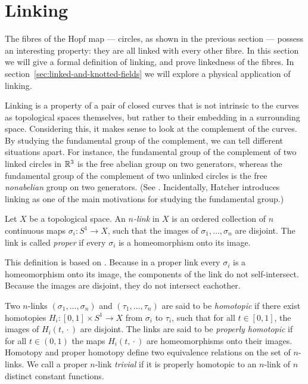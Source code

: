 \section{Linking}
\label{sec:linking}
The fibres of the Hopf map — circles, as shown in the previous section — possess an interesting property:
they are all linked with every other fibre.
In this section we will give a formal definition of linking,
and prove linkedness of the fibres.
In section~\ref{sec:linked-and-knotted-fields} we will explore a physical application of linking.

Linking is a property of a pair of closed curves
that is not intrinsic to the curves as topological spaces themselves,
but rather to their embedding in a surrounding space.
Considering this, it makes sense to look at the complement of the curves.
By studying the fundamental group of the complement,
we can tell different situations apart.
For instance,
the fundamental group of the complement of two linked circles in $\mathbb{R}^3$
is the free abelian group on two generators,
whereas the fundamental group of the complement of two unlinked circles
is the free \emph{nonabelian} group on two generators.
(See \parencite[p.~46]{hatcher2002}.
Incidentally, Hatcher introduces linking
as one of the main motivations for studying the fundamental group.)

Let $X$ be a topological space.
An \emph{$n$-link} in $X$ is an ordered collection of $n$ continuous maps $\sigma_i : S^1 \to X$,
such that the images of $\sigma_1, \ldots, \sigma_n$ are disjoint.
The link is called \emph{proper} if every $\sigma_i$ is a homeomorphism onto its image.

This definition is based on \parencite{milnor1954}.
Because in a proper link every $\sigma_i$ is a homeomorphism onto its image,
the components of the link do not self-intersect.
Because the images are disjoint,
they do not intersect eachother.

Two $n$-links $(\sigma_1, \ldots, \sigma_n)$ and $(\tau_1, \ldots, \tau_n)$
are said to be \emph{homotopic}
if there exist homotopies $H_i : [0, 1] \times S^1 \to X$ from $\sigma_i$ to $\tau_i$,
such that for all $t \in [0, 1]$,
the images of $H_i(t, {}\cdot{})$ are disjoint.
The links are said to be \emph{properly homotopic} if
for all $t \in (0, 1)$ the maps $H_i(t, {}\cdot{})$ are homeomorphisms onto their images.
Homotopy and proper homotopy define two equivalence relations on the set of $n$-links.
We call a proper $n$-link \emph{trivial}
if it is properly homotopic to an $n$-link of $n$ distinct constant functions.


